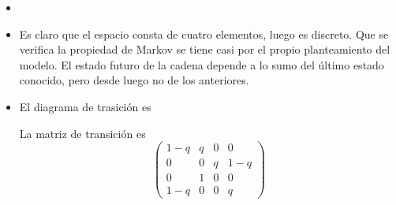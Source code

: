 \documentclass[twoside]{article}
\begin{document}
\begin{solucion}

\begin{itemize}
\item[]
\item Es claro que el espacio consta de cuatro elementos, luego es discreto. Que se verifica la propiedad de Markov se tiene casi por el propio planteamiento del modelo. El estado futuro de la cadena depende a lo sumo del último estado conocido, pero desde luego no de los anteriores. 
\item El diagrama de trasición es

\begin{center}
\end{center}
La matriz de transición es
$$
\begin{pmatrix}
1-q	& q & 0 & 0\\
0 	& 0	& q	& 1-q\\
0	& 1 & 0 & 0\\
1-q & 0 & 0 & q
\end{pmatrix}
$$
\end{itemize}
\end{solucion}
\end{document}
